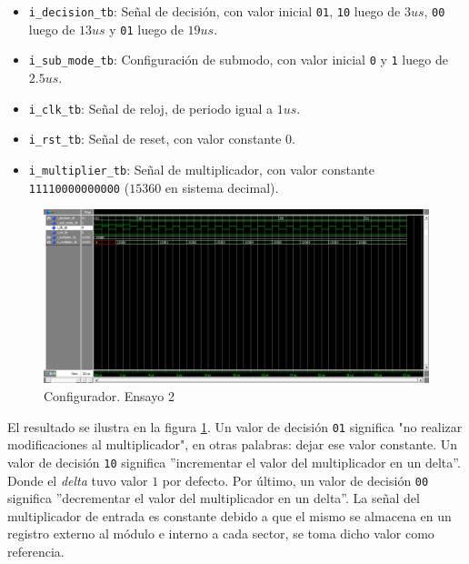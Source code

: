 \begin{itemize}

\item
\texttt{i\_decision\_tb}: Señal de decisión, con valor inicial \texttt{01}, \texttt{10} luego de $3 us$, \texttt{00} luego de $13 us$ y \texttt{01} luego de $19 us$.

\item
\texttt{i\_sub\_mode\_tb}: Configuración de submodo, con valor inicial \texttt{0} y \texttt{1} luego de $2.5 us$.

\item
\texttt{i\_clk\_tb}: Señal de reloj, de periodo igual a $1 us$.

\item
\texttt{i\_rst\_tb}: Señal de reset, con valor constante $0$.

\item
\texttt{i\_multiplier\_tb}: Señal de multiplicador, con valor constante \texttt{11110000000000} ($15360$ en sistema decimal).

\end{itemize}

\begin{figure}
\centering
\includegraphics[scale=0.52, angle=270]{./Figures/multiplier_setting_ensayo_1.png}
\caption{Configurador. Ensayo 2}
\label{fig:multiplier_setting_ensayo_1}
\end{figure}

El resultado se ilustra en la figura \ref{fig:multiplier_setting_ensayo_1}. Un valor de decisión \texttt{01} significa "no realizar modificaciones al multiplicador", en otras palabras: dejar ese valor constante. Un valor de decisión \texttt{10} significa ''incrementar el valor del multiplicador en un delta''. Donde el \textit{delta} tuvo valor $1$ por defecto. Por último, un valor de decisión \texttt{00} significa ''decrementar el valor del multiplicador en un delta''. La señal del multiplicador de entrada es constante debido a que el mismo se almacena en un registro externo al módulo e interno a cada sector, se toma dicho valor como referencia.

